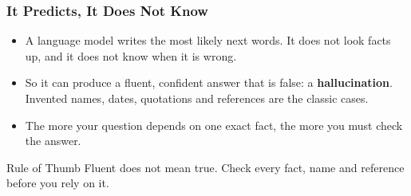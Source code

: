 
\begin{frame}[fragile]\frametitle{It Predicts, It Does Not Know}
\begin{itemize}
\item A language model writes the most likely next words. It does not look facts up, and it does not know when it is wrong.
\item So it can produce a fluent, confident answer that is false: a \textbf{hallucination}. Invented names, dates, quotations and references are the classic cases.
\item The more your question depends on one exact fact, the more you must check the answer.
\end{itemize}
\begin{alertblock}{Rule of Thumb}
Fluent does not mean true. Check every fact, name and reference before you rely on it.
\end{alertblock}
\end{frame}


